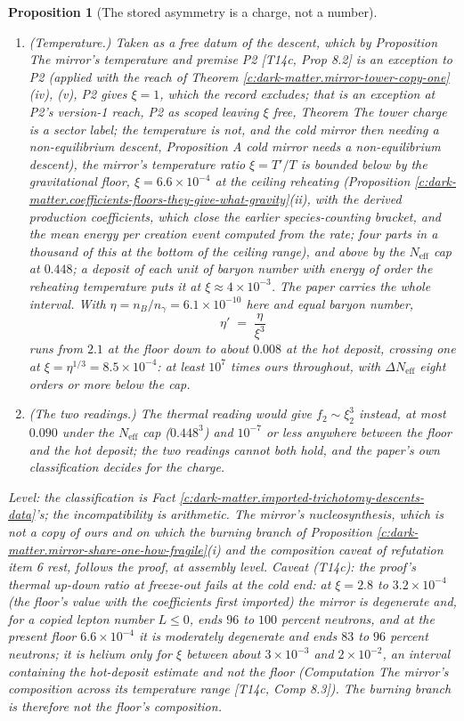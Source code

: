 \documentclass[11pt]{article}
\newtheorem{proposition}[theorem]{Proposition}
\theoremstyle{definition}
\theoremstyle{plain}
\providecommand{\Neff}{}\renewcommand{\Neff}{N_{\mathrm{eff}}}
\begin{document}
\begin{proposition}[The stored asymmetry is a charge, not a number]
\begin{enumerate}
\item[(iii)] \emph{(Temperature.)} Taken as a free datum of the descent, which by Proposition \emph{The mirror's temperature and premise P2} [T14c, Prop 8.2] is an exception to P2 (applied with the reach of Theorem \ref{c:dark-matter.mirror-tower-copy-one}(iv), (v), P2 gives $\xi = 1$, which the record excludes; that is an exception at P2's version-1 reach, P2 as scoped leaving $\xi$ free, Theorem \emph{The tower charge is a sector label; the temperature is not}, and the cold mirror then needing a non-equilibrium descent, Proposition \emph{A cold mirror needs a non-equilibrium descent}), the mirror's temperature ratio $\xi = T'/T$ is bounded below by the gravitational floor, $\xi = 6.6 \times 10^{-4}$ at the ceiling reheating (Proposition \ref{c:dark-matter.coefficients-floors-they-give-what-gravity}(ii), with the derived production coefficients, which close the earlier species-counting bracket, and the mean energy per creation event computed from the rate; four parts in a thousand of this at the bottom of the ceiling range), and above by the $\Neff$ cap at $0.448$; a deposit of each unit of baryon number with energy of order the reheating temperature puts it at $\xi \approx 4 \times 10^{-3}$. The paper carries the whole interval. With $\eta = n_{B}/n_{\gamma} = 6.1 \times 10^{-10}$ here and equal baryon number,
\[
\eta' \;=\; \frac{\eta}{\xi^{3}}
\]
runs from $2.1$ at the floor down to about $0.008$ at the hot deposit, crossing one at $\xi = \eta^{1/3} = 8.5 \times 10^{-4}$: at least $10^{7}$ times ours throughout, with $\Delta\Neff$ eight orders or more below the cap.
\item[(iv)] \emph{(The two readings.)} The thermal reading would give $f_{2} \sim \xi_{2}^{3}$ instead, at most $0.090$ under the $\Neff$ cap ($0.448^{3}$) and $10^{-7}$ or less anywhere between the floor and the hot deposit; the two readings cannot both hold, and the paper's own classification decides for the charge.
\end{enumerate}
Level: the classification is Fact \ref{c:dark-matter.imported-trichotomy-descents-data}'s; the incompatibility is arithmetic. The mirror's nucleosynthesis, which is not a copy of ours and on which the burning branch of Proposition \ref{c:dark-matter.mirror-share-one-how-fragile}(i) and the composition caveat of refutation item 6 rest, follows the proof, at assembly level. Caveat (T14c): the proof's thermal up-down ratio at freeze-out fails at the cold end: at $\xi = 2.8$ to $3.2 \times 10^{-4}$ (the floor's value with the coefficients first imported) the mirror is degenerate and, for a copied lepton number $L \leq 0$, ends $96$ to $100$ percent neutrons, and at the present floor $6.6 \times 10^{-4}$ it is moderately degenerate and ends $83$ to $96$ percent neutrons; it is helium only for $\xi$ between about $3 \times 10^{-3}$ and $2 \times 10^{-2}$, an interval containing the hot-deposit estimate and not the floor (Computation \emph{The mirror's composition across its temperature range} [T14c, Comp 8.3]). The burning branch is therefore not the floor's composition.
\end{proposition}
\end{document}
